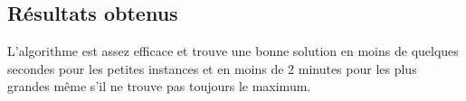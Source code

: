 \documentclass[12pt,a4paper]{article}
\begin{document}
\subsection{Résultats obtenus}
L'algorithme est assez efficace et trouve une bonne solution en moins de quelques secondes pour les petites instances et en moins de 2 minutes pour les plus grandes même s'il ne trouve pas toujours le maximum.\\
\end{document}
